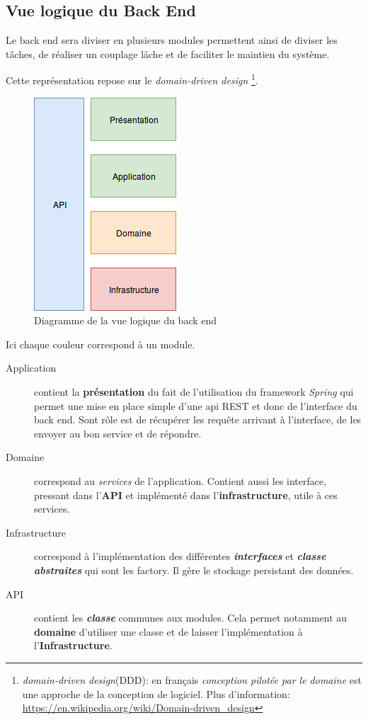 \documentclass[12pt]{article}
\begin{document}
\subsection{Vue logique du Back End}
Le back end sera diviser en plusieurs modules permettent ainsi de diviser les tâches, de réaliser un couplage lâche et de faciliter le maintien du système.

Cette représentation repose sur le \textit{domain-driven design} \footnote{\textit{domain-driven design}(DDD): en français \textit{conception pilotée par le domaine} est une approche de la conception de logiciel. Plus d'information: \url{https://en.wikipedia.org/wiki/Domain-driven_design}}.

\begin{figure}[h]
    \centering
    \includegraphics[]{img/Vue_logique_back.png}
    \caption{Diagramme de la vue logique du back end}
\end{figure}

Ici chaque couleur correspond à un module.


\begin{description}
    \item [Application] contient la \textbf{présentation} du fait de l'utilisation du framework \textit{Spring} qui permet une mise en place simple d'une api REST et donc de l'interface du back end. Sont rôle est de récupérer les requête arrivant à l'interface, de les envoyer au bon service et de répondre.
    \item [Domaine] correspond au \textit{services} de l'application. Contient aussi les interface, pressant  dans l'\textbf{API} et implémenté dans l'\textbf{infrastructure}, utile à ces services.
    \item [Infrastructure] correspond à l'implémentation des différentes \textbf{\textit{interfaces}} et \textbf{\textit{classe abstraites}} qui sont les factory. Il gère le stockage persistant des données.
    \item [API] contient les \textbf{\textit{classe}} communes aux modules. Cela permet notamment au \textbf{domaine} d'utiliser une classe et de laisser l'implémentation à l'\textbf{Infrastructure}.
\end{description}
\end{document}
